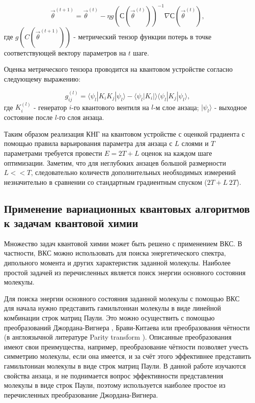 \documentclass[14pt]{extarticle}
\begin{document}
\begin{equation}
\vec{\theta}^{(t+1)} = \vec{\theta}^{(t)} - \eta g ( С( \vec{\theta}^{(t)} )  )^{-1} \nabla С( \vec{\theta}^{(t)}  ),
\end{equation} где $g ( C( \vec{\theta}^{(t+1)} )  )$ - метрический тензор функции потерь в точке соответствующей вектору параметров на $t$ шаге.

\qquad Оценка метрического тензора проводится на квантовом устройстве согласно следующему выражению:

\begin{equation}
g_{ij}^{(l)} = \langle \psi_{l} | K_{i}K_{j} |\psi_{l}  \rangle - \langle \psi_{l} | K_{i} | \rangle  \langle \psi_{l} | K_{j} |\psi_{l}  \rangle ,
\end{equation} где $K^{(l)}_{i}$ - генератор $i$-го квантового вентиля на $l$-м слое анзаца; $|\psi_{l}  \rangle$ - выходное состояние после $l$-го слоя анзаца.

\qquad Таким образом реализация КНГ на квантовом устройстве с оценкой градиента с помощью правила варьирования параметра для анзаца с $L$ слоями и $T$ параметрами требуется провести $E = 2T + L$ оценок на каждом шаге оптимизации. Заметим, что для неглубоких анзацев большой размерности $L<<T$, следовательно количеств дополнительных необходимых измерений незначительно в сравнении со стандартным градиентным спуском ($2T + L ~ 2T$).

\subsection[Применение вариационных квантовых алгоритмов к задачам квантовой химии]{Применение вариационных квантовых \linebreak алгоритмов к задачам квантовой химии}

\qquad Множество задач квантовой химии может быть решено с применением ВКС. В частности, ВКС можно использовать для поиска энергетического спектра, дипольного момента и других характеристик заданной молекулы. Наиболее простой задачей из перечисленных является поиск энергии основного состояния молекулы. 

\qquad Для поиска энергии основного состояния заданной молекулы с помощью ВКС для начала нужно представить гамильтониан молекулы в виде линейной комбинации строк матриц Паули. Это можно осуществить с помощью преобразований Джордана-Вигнера \cite{article}, Брави-Китаева \cite{Seeley_2012} или преобразования чётности (в англоязычной литературе Parity transform \cite{https://doi.org/10.48550/arxiv.hep-th/9312092}). Описанные преобразования имеют свои преимущества, например, преобразование чётности позволяет учесть симметрию молекулы, если она имеется, и за счёт этого эффективнее представить гамильтониан молекулы в виде строк матриц Паули. В данной работе изучаются свойства анзаца, и не поднимается вопрос эффективности представления молекулы в виде строк Паули, поэтому используется наиболее простое из перечисленных преобразование Джордана-Вигнера.
\end{document}
